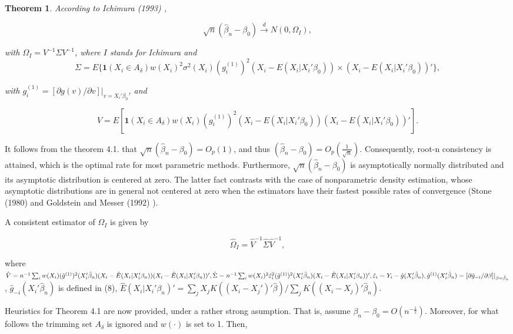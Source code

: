 \documentclass[a4paper]{article}
\begin{document}
\newtheorem{theorem}{Theorem}[section]

\begin{theorem}
According to Ichimura (1993) \cite{[6]}, 

\[ \sqrt{n}(\hat{\beta}_n - \beta_0) \stackrel{d}{\rightarrow} N(0,\Omega_I), \] 

 with $\Omega_I = V^{-1}\Sigma V^{-1}$, where $I$ stands for Ichimura and 
\[\Sigma = E\{\mathbf{1}{(X_i \in A_\delta)}w(X_i)^2\sigma^2(X_i)(g_i^{(1)})^2(X_i - E(X_i|X_i'\beta_0)) \times (X_i - E(X_i|X_i'\beta_0))'\},\]

with $g_i^{(1)} = [\partial g(v)/\partial v]|_{v = X_i'\beta_0}$, and

\[ V = E[ \mathbf{1}{(X_i \in A_\delta)} w(X_i)(g_i^{(1)})^2(X_i - E(X_i|X_i'\beta_0))(X_i - E(X_i|X_i'\beta_0))'].\]

\end{theorem}

It follows from the theorem 4.1. that $\sqrt{n}(\hat{\beta}_n - \beta_0)=O_p(1)$, and thus $(\hat{\beta}_n - \beta_0) = O_p\left(\frac{1}{\sqrt{n}}\right)$. Consequently, root-n consistency is attained, which is the optimal rate for most parametric methods. Furthermore, $\sqrt{n}(\hat{\beta}_n - \beta_0)$ is asymptotically normally distributed and its asymptotic distribution is centered at zero. The latter fact contrasts with the case of nonparametric density estimation, whose asymptotic distributions are in general not centered at zero when the estimators have their fastest possible rates of convergence (Stone (1980) \cite{[15]} and Goldstein and Messer (1992) \cite{[16]}). 


A consistent estimator of $\Omega_I$ is given by

\[ \hat{\Omega}_I = \hat{V}^{-1}\hat{\Sigma}\hat{V}^{-1}, \]

where $\hat{V} = n^{-1}\sum_{i} w(X_i)(\hat{g}^{(1)})^2(X_i'\hat{\beta}_n)(X_i - \hat{E}(X_i|X_i'\beta_n))(X_i - \hat{E}(X_i|X_i'\beta_n))', \hat{\Sigma} = n^{-1}\sum_{i} w(X_i)^2\hat{\varepsilon}_{i}^{2}(\hat{g}^{(1)})^2(X_i'\hat{\beta}_n)(X_i - \hat{E}(X_i|X_i'\beta_n))', \hat{\varepsilon}_i = Y_i - \hat{g}(X_i'\hat{\beta}_n), \hat{g}^{(1)}(X_i'\hat{\beta}_n) \linebreak
= [\partial \hat{g}_{-i}/\partial \beta]|_{\beta=\hat{\beta}_n}$, $\hat{g}_{-i}(X_i'\hat{\beta}_n)$ is defined in (8), $\hat{E}(X_i|X_i'\beta_n)' = \sum_{j} X_jK((X_i - X_j')'\hat{\beta})/ \sum_{j}K((X_i - X_j)'\hat{\beta}_n).$

Heuristics for Theorem 4.1 are now provided, under a rather strong asumption. That is, assume $\beta_n - \beta_0 = O(n^{-\frac{1}{2}})$. Moreover, for what follows the trimming set $A_\delta$ is ignored and $w(\cdot)$ is set to 1. Then, 
\end{document}
